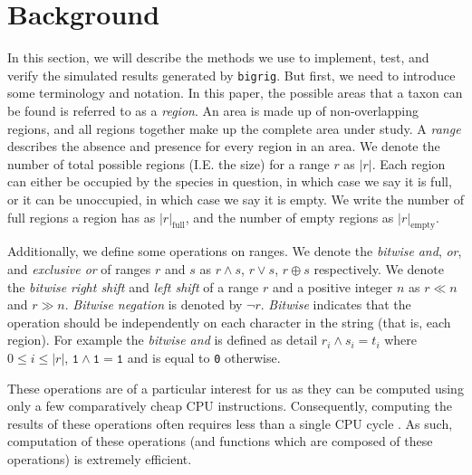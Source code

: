 \documentclass[a4paper]{article}
\newcommand{\CountFull}[1]{|#1|_\text{full}}
\newcommand{\CountEmpty}[1]{|#1|_\text{empty}}
\newcommand{\bigrig}{\texttt{bigrig}}
\newcommand{\rand}[2]{#1 \land #2}
\newcommand{\ror}[2]{#1 \lor #2}
\newcommand{\rneg}[1]{\neg #1}
\newcommand{\rxor}[2]{#1 \oplus #2}
\newcommand{\rLshift}[2]{#1 \ll #2}
\newcommand{\rRshift}[2]{#1 \gg #2}
\begin{document}
\section{Background}

In this section, we will describe the methods we use to implement, test, and verify the simulated results generated by
\bigrig{}.
But first, we need to introduce some terminology and notation.
In this paper, the possible areas that a taxon can be found is referred to as a \textit{region}.
An area is made up of non-overlapping regions, and all regions together make up the complete area under study.
A \textit{range} describes the absence and presence for every region in an area.
We denote the number of total possible regions (I.E. the size) for a range \( r \) as \( |r| \).
Each region can either be occupied by the species in question, in which case we say it is full, or it can be unoccupied,
in which case we say it is empty.
We write the number of full regions a region has as \( \CountFull{r} \), and the number of empty regions as \(
\CountEmpty{r} \).

Additionally, we define some operations on ranges.
We denote the \textit{bitwise} \textit{and}, \textit{or}, and \textit{exclusive or} of ranges $r$ and $s$ as
$\rand{r}{s}$, $\ror{r}{s}$, $\rxor{r}{s}$ respectively.
We denote the \textit{bitwise} \textit{right shift} and \textit{left shift} of a range $r$ and a positive integer $n$ as
$\rLshift{r}{n}$ and $\rRshift{r}{n}$\footnotemark.
\textit{Bitwise negation} is denoted by $\rneg{r}$.
\textit{Bitwise} indicates that the operation should be independently on each character in the string (that is, each
region). 
For example the \textit{bitwise and} is defined as detail $r_i \land s_i = t_i$ where $0 \leq i \leq |r|$, $\texttt{1}
\land \texttt{1} = \texttt{1}$ and is equal to \texttt{0} otherwise.


These operations are of a particular interest for us as they can be computed using only a few comparatively cheap CPU
instructions.
Consequently, computing the results of these operations often requires less than a single CPU cycle
\cite{Abel19a} \footnotemark.
As such, computation of these operations (and functions which are composed of these operations) is extremely efficient.

\end{document}
